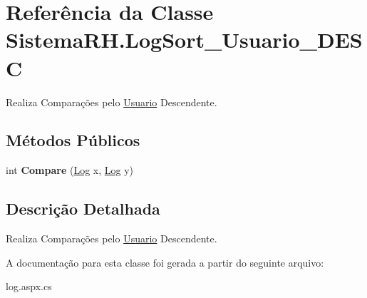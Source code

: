 \hypertarget{class_sistema_r_h_1_1_log_sort___usuario___d_e_s_c}{
\section{Referência da Classe SistemaRH.LogSort\_\-Usuario\_\-DESC}
\label{class_sistema_r_h_1_1_log_sort___usuario___d_e_s_c}
}


Realiza Comparações pelo \hyperlink{class_sistema_r_h_1_1_usuario}{Usuario} Descendente.  


\subsection*{Métodos Públicos}
\begin{DoxyCompactItemize}
\item 
\hypertarget{class_sistema_r_h_1_1_log_sort___usuario___d_e_s_c_a8109134d23d65c77de08e2eeba973242}{
int {\bfseries Compare} (\hyperlink{class_sistema_r_h_1_1_log}{Log} x, \hyperlink{class_sistema_r_h_1_1_log}{Log} y)}
\label{class_sistema_r_h_1_1_log_sort___usuario___d_e_s_c_a8109134d23d65c77de08e2eeba973242}

\end{DoxyCompactItemize}


\subsection{Descrição Detalhada}
Realiza Comparações pelo \hyperlink{class_sistema_r_h_1_1_usuario}{Usuario} Descendente. 

A documentação para esta classe foi gerada a partir do seguinte arquivo:\begin{DoxyCompactItemize}
\item 
log.aspx.cs\end{DoxyCompactItemize}
